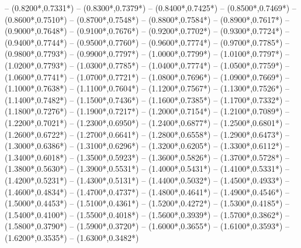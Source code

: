 {	-- ({0.8200*\dx},{0.7331*\dy})
	-- ({0.8300*\dx},{0.7379*\dy})
	-- ({0.8400*\dx},{0.7425*\dy})
	-- ({0.8500*\dx},{0.7469*\dy})
	-- ({0.8600*\dx},{0.7510*\dy})
	-- ({0.8700*\dx},{0.7548*\dy})
	-- ({0.8800*\dx},{0.7584*\dy})
	-- ({0.8900*\dx},{0.7617*\dy})
	-- ({0.9000*\dx},{0.7648*\dy})
	-- ({0.9100*\dx},{0.7676*\dy})
	-- ({0.9200*\dx},{0.7702*\dy})
	-- ({0.9300*\dx},{0.7724*\dy})
	-- ({0.9400*\dx},{0.7744*\dy})
	-- ({0.9500*\dx},{0.7760*\dy})
	-- ({0.9600*\dx},{0.7774*\dy})
	-- ({0.9700*\dx},{0.7785*\dy})
	-- ({0.9800*\dx},{0.7793*\dy})
	-- ({0.9900*\dx},{0.7797*\dy})
	-- ({1.0000*\dx},{0.7799*\dy})
	-- ({1.0100*\dx},{0.7797*\dy})
	-- ({1.0200*\dx},{0.7793*\dy})
	-- ({1.0300*\dx},{0.7785*\dy})
	-- ({1.0400*\dx},{0.7774*\dy})
	-- ({1.0500*\dx},{0.7759*\dy})
	-- ({1.0600*\dx},{0.7741*\dy})
	-- ({1.0700*\dx},{0.7721*\dy})
	-- ({1.0800*\dx},{0.7696*\dy})
	-- ({1.0900*\dx},{0.7669*\dy})
	-- ({1.1000*\dx},{0.7638*\dy})
	-- ({1.1100*\dx},{0.7604*\dy})
	-- ({1.1200*\dx},{0.7567*\dy})
	-- ({1.1300*\dx},{0.7526*\dy})
	-- ({1.1400*\dx},{0.7482*\dy})
	-- ({1.1500*\dx},{0.7436*\dy})
	-- ({1.1600*\dx},{0.7385*\dy})
	-- ({1.1700*\dx},{0.7332*\dy})
	-- ({1.1800*\dx},{0.7276*\dy})
	-- ({1.1900*\dx},{0.7217*\dy})
	-- ({1.2000*\dx},{0.7154*\dy})
	-- ({1.2100*\dx},{0.7089*\dy})
	-- ({1.2200*\dx},{0.7021*\dy})
	-- ({1.2300*\dx},{0.6950*\dy})
	-- ({1.2400*\dx},{0.6877*\dy})
	-- ({1.2500*\dx},{0.6801*\dy})
	-- ({1.2600*\dx},{0.6722*\dy})
	-- ({1.2700*\dx},{0.6641*\dy})
	-- ({1.2800*\dx},{0.6558*\dy})
	-- ({1.2900*\dx},{0.6473*\dy})
	-- ({1.3000*\dx},{0.6386*\dy})
	-- ({1.3100*\dx},{0.6296*\dy})
	-- ({1.3200*\dx},{0.6205*\dy})
	-- ({1.3300*\dx},{0.6112*\dy})
	-- ({1.3400*\dx},{0.6018*\dy})
	-- ({1.3500*\dx},{0.5923*\dy})
	-- ({1.3600*\dx},{0.5826*\dy})
	-- ({1.3700*\dx},{0.5728*\dy})
	-- ({1.3800*\dx},{0.5630*\dy})
	-- ({1.3900*\dx},{0.5531*\dy})
	-- ({1.4000*\dx},{0.5431*\dy})
	-- ({1.4100*\dx},{0.5331*\dy})
	-- ({1.4200*\dx},{0.5231*\dy})
	-- ({1.4300*\dx},{0.5131*\dy})
	-- ({1.4400*\dx},{0.5032*\dy})
	-- ({1.4500*\dx},{0.4933*\dy})
	-- ({1.4600*\dx},{0.4834*\dy})
	-- ({1.4700*\dx},{0.4737*\dy})
	-- ({1.4800*\dx},{0.4641*\dy})
	-- ({1.4900*\dx},{0.4546*\dy})
	-- ({1.5000*\dx},{0.4453*\dy})
	-- ({1.5100*\dx},{0.4361*\dy})
	-- ({1.5200*\dx},{0.4272*\dy})
	-- ({1.5300*\dx},{0.4185*\dy})
	-- ({1.5400*\dx},{0.4100*\dy})
	-- ({1.5500*\dx},{0.4018*\dy})
	-- ({1.5600*\dx},{0.3939*\dy})
	-- ({1.5700*\dx},{0.3862*\dy})
	-- ({1.5800*\dx},{0.3790*\dy})
	-- ({1.5900*\dx},{0.3720*\dy})
	-- ({1.6000*\dx},{0.3655*\dy})
	-- ({1.6100*\dx},{0.3593*\dy})
	-- ({1.6200*\dx},{0.3535*\dy})
	-- ({1.6300*\dx},{0.3482*\dy})
}
